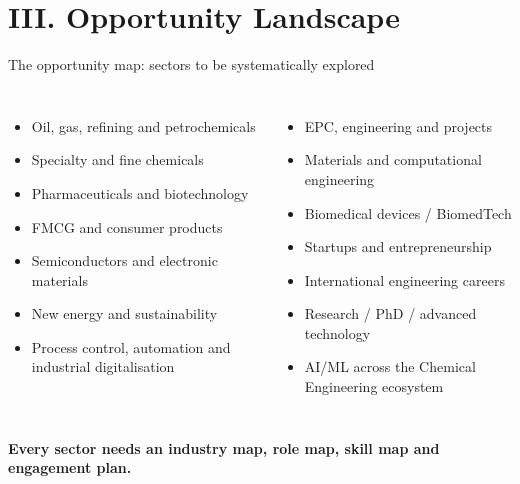 \documentclass[aspectratio=169,11pt]{beamer}
\newcommand{\key}[1]{\textbf{\color{IITblue}#1}}
\begin{document}
\section{III. Opportunity Landscape}
\begin{frame}{The opportunity map: sectors to be systematically explored}
\begin{columns}[T]
\begin{itemize}
\item Oil, gas, refining and petrochemicals
\item Specialty and fine chemicals
\item Pharmaceuticals and biotechnology
\item FMCG and consumer products
\item Semiconductors and electronic materials
\item New energy and sustainability
\item Process control, automation and industrial digitalisation
\end{itemize}
\begin{itemize}
\item EPC, engineering and projects
\item Materials and computational engineering
\item Biomedical devices / BiomedTech
\item Startups and entrepreneurship
\item International engineering careers
\item Research / PhD / advanced technology
\item AI/ML across the Chemical Engineering ecosystem
\end{itemize}
\end{columns}
\vspace{3mm}
\centering\large\key{Every sector needs an industry map, role map, skill map and engagement plan.}
\end{frame}
\end{document}
